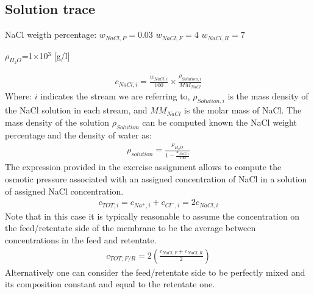 \documentclass[letterpaper,10pt,english]{jupyterBook}
\begin{document}
\subsection{Solution trace}
\label{\detokenize{Exercise_W3_2021:solution-trace}}
\sphinxAtStartPar
{}

\sphinxAtStartPar
NaCl weigth percentage:
\(w_{NaCl,P}=0.03\)
\(w_{NaCl,F}=4\)
\(w_{NaCl,R}=7\)

\sphinxAtStartPar
{}
\(\rho_{H_2O}\)=1\(\times\)10\(^3\) {[}g/l{]}

\sphinxAtStartPar
{}
\begin{equation*}
\begin{split}
c_{NaCl,i}=\frac{w_{NaCl,i}}{100}\times\frac{\rho_{Solution,i}}{MM_{NaCl}}
\end{split}
\end{equation*}
\sphinxAtStartPar
Where: \(i\) indicates the stream we are referring to, \(\rho_{Solution,i}\)  is the mass density of the NaCl solution in each stream, and \(MM_{NaCl}\) is the molar mass of NaCl. 
The mass density of the solution \(\rho_{Solution}\) can be computed known the NaCl weight percentage and the density of  water as:
\begin{equation*}
\begin{split}
\rho_{solution}=\frac{\rho_{H_2O}}{1-\frac{w_{NaCl,i}}{100}}
\end{split}
\end{equation*}
\sphinxAtStartPar
{}
The expression provided in the exercise assignment allows to compute the osmotic pressure associated with an assigned concentration of NaCl in a solution of assigned NaCl concentration.
\begin{equation*}
\begin{split}
c_{TOT,i}=c_{Na^+,i}+c_{Cl^-,i}=2c_{NaCl,i}
\end{split}
\end{equation*}
\sphinxAtStartPar
Note that in this case it is typically reasonable to assume the concentration on the feed/retentate side of the membrane to be the average between concentrations in the feed and retentate.
\begin{equation*}
\begin{split}
c_{TOT,F/R}=2 \left({\frac{c_{NaCl,F}+c_{NaCl,R}}{2}}\right)
\end{split}
\end{equation*}
\sphinxAtStartPar
Alternatively one can consider the feed/retentate side to be perfectly mixed and its composition constant and equal to the retentate one.
\end{document}
